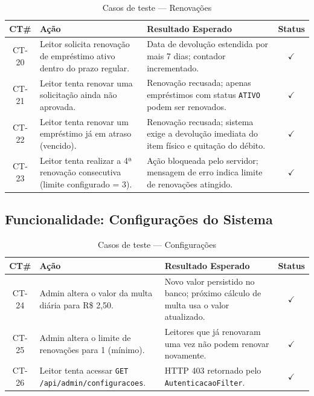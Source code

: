 \begin{table}[h!]
	\centering
	\caption{Casos de teste --- Renovações}
	\label{tab:teste_renovacao}
	\begin{tabular}{|c|p{6cm}|p{6cm}|c|}
		\hline
		\textbf{CT\#} & \textbf{Ação} & \textbf{Resultado Esperado} & \textbf{Status} \\ \hline
		CT-20 & Leitor solicita renovação de empréstimo ativo dentro do prazo regular. & Data de devolução estendida por mais 7 dias; contador incrementado. & $\checkmark$ \\ \hline
		CT-21 & Leitor tenta renovar uma solicitação ainda não aprovada. & Renovação recusada; apenas empréstimos com status \texttt{ATIVO} podem ser renovados. & $\checkmark$ \\ \hline
		CT-22 & Leitor tenta renovar um empréstimo já em atraso (vencido). & Renovação recusada; sistema exige a devolução imediata do item físico e quitação do débito. & $\checkmark$ \\ \hline
		CT-23 & Leitor tenta realizar a 4ª renovação consecutiva (limite configurado = 3). & Ação bloqueada pelo servidor; mensagem de erro indica limite de renovações atingido. & $\checkmark$ \\ \hline
	\end{tabular}
\end{table}

\subsection{Funcionalidade: Configurações do Sistema}

\begin{table}[h!]
	\centering
	\caption{Casos de teste --- Configurações}
	\label{tab:teste_config}
	\begin{tabular}{|c|p{6cm}|p{6cm}|c|}
		\hline
		\textbf{CT\#} & \textbf{Ação} & \textbf{Resultado Esperado} & \textbf{Status} \\ \hline
		CT-24 & Admin altera o valor da multa diária para R\$ 2,50. & Novo valor persistido no banco; próximo cálculo de multa usa o valor atualizado. & $\checkmark$ \\ \hline
		CT-25 & Admin altera o limite de renovações para 1 (mínimo). & Leitores que já renovaram uma vez não podem renovar novamente. & $\checkmark$ \\ \hline
		CT-26 & Leitor tenta acessar \texttt{GET /api/admin/configuracoes}. & HTTP 403 retornado pelo \texttt{AutenticacaoFilter}. & $\checkmark$ \\ \hline
	\end{tabular}
\end{table}

